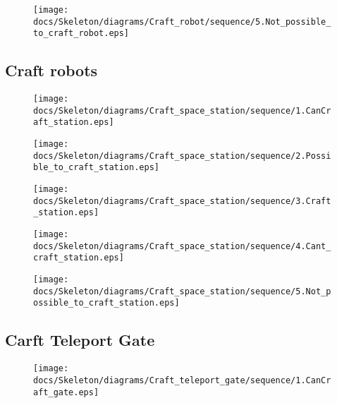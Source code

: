 \begin{figure}[H] 
    \centering 
    \texttt{[image: docs/Skeleton/diagrams/Craft\_robot/sequence/5.Not\_possible\_to\_craft\_robot.eps]} 
    \caption{} 
\end{figure} 

\subsection{Craft robots}

\begin{figure}[H] 
    \centering 
    \texttt{[image: docs/Skeleton/diagrams/Craft\_space\_station/sequence/1.CanCraft\_station.eps]} 
    \caption{} 
\end{figure} 

\begin{figure}[H] 
    \centering 
    \texttt{[image: docs/Skeleton/diagrams/Craft\_space\_station/sequence/2.Possible\_to\_craft\_station.eps]} 
    \caption{} 
\end{figure} 

\begin{figure}[H] 
    \centering 
    \texttt{[image: docs/Skeleton/diagrams/Craft\_space\_station/sequence/3.Craft\_station.eps]} 
    \caption{} 
\end{figure} 

\begin{figure}[H] 
    \centering 
    \texttt{[image: docs/Skeleton/diagrams/Craft\_space\_station/sequence/4.Cant\_craft\_station.eps]} 
    \caption{} 
\end{figure} 

\begin{figure}[H] 
    \centering 
    \texttt{[image: docs/Skeleton/diagrams/Craft\_space\_station/sequence/5.Not\_possible\_to\_craft\_station.eps]} 
    \caption{} 
\end{figure} 

\subsection{Carft Teleport Gate}

\begin{figure}[H] 
    \centering 
    \texttt{[image: docs/Skeleton/diagrams/Craft\_teleport\_gate/sequence/1.CanCraft\_gate.eps]} 
    \caption{} 
\end{figure} 

